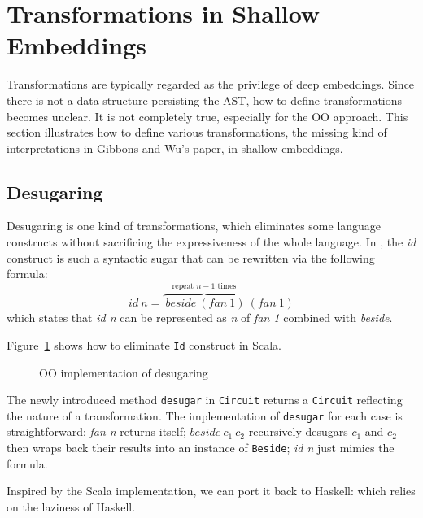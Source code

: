 \section{Transformations in Shallow Embeddings}
Transformations are typically regarded as the privilege of deep embeddings.
Since there is not a data structure persisting the AST, how to define transformations
becomes unclear.
It is not completely true, especially for the OO approach.
This section illustrates how to define various transformations, the missing
kind of interpretations in Gibbons and Wu's paper, in shallow embeddings.

\subsection{Desugaring}
Desugaring is one kind of transformations, which eliminates some
language constructs without sacrificing the expressiveness of the whole language.
In \dsl, the \emph{id} construct is such a syntactic sugar that can
be rewritten via the following formula:
$$id\ n = \overbrace{\ beside\ (fan\ 1)}^{\text{repeat }n-1\text{ times}}\ (fan\ 1)$$
which states that \emph{id n} can be represented as \emph{n} of \emph{fan 1} combined with \emph{beside}.

Figure~\ref{code:desugar} shows how to eliminate \lstinline{Id} construct in Scala.
\begin{figure}
\caption{OO implementation of desugaring}
\label{code:desugar}
\end{figure}
The newly introduced method \lstinline{desugar} in \lstinline{Circuit} returns a
\lstinline{Circuit} reflecting the nature of a transformation. The implementation of \lstinline{desugar} for each case is
straightforward: \emph{fan n} returns itself; $beside\ c_1\ c_2$ recursively desugars $c_1$ and $c_2$ then wraps back
their results into an instance of \lstinline{Beside}; \emph{id n} just mimics the
formula.

Inspired by the Scala implementation, we can port it back to Haskell:
which relies on the laziness of Haskell.

